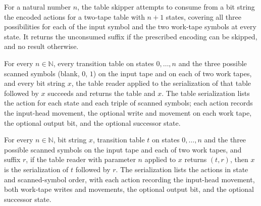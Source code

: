 \begin{definition}
\label{Turing.codeSkipTable2}
\leanok
{}
For a natural number $n$, the table skipper attempts to consume from a bit string the
encoded actions for a two-tape table with $n+1$ states, covering all three possibilities
for each of the input symbol and the two work-tape symbols at every state. It returns
the unconsumed suffix if the prescribed encoding can be skipped, and no result
otherwise.
\end{definition}

\begin{lemma}
\label{Turing.codeReadTable2_append}
\leanok
{}
For every $n\in\mathbb N$, every transition table on states $0,\ldots,n$ and the three
possible scanned symbols (blank, $0$, $1$) on the input tape and on each of two work
tapes, and every bit string $x$, the table reader applied to the serialization of that
table followed by $x$ succeeds and returns the table and $x$. The table serialization
lists the action for each state and each triple of scanned symbols; each action records
the input-head movement, the optional write and movement on each work tape, the optional
output bit, and the optional successor state.
\end{lemma}

\begin{lemma}
\label{Turing.codeReadTable2_sound}
\leanok
{}
For every $n\in\mathbb N$, bit string $x$, transition table $t$ on states $0,\ldots,n$
and the three possible scanned symbols on the input tape and each of two work tapes, and
suffix $r$, if the table reader with parameter $n$ applied to $x$ returns $(t,r)$, then
$x$ is the serialization of $t$ followed by $r$. The serialization lists the actions in
state and scanned-symbol order, with each action recording the input-head movement, both
work-tape writes and movements, the optional output bit, and the optional successor
state.
\end{lemma}

